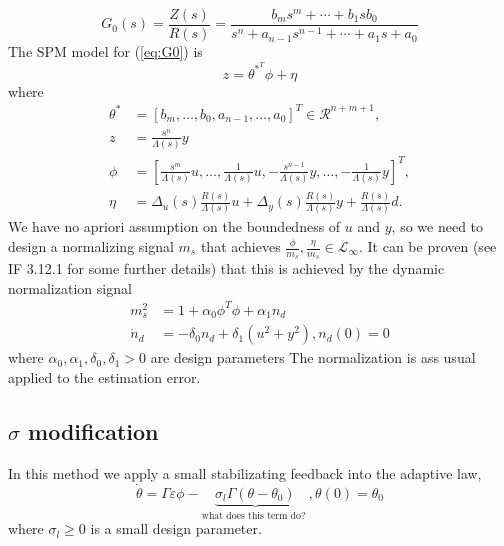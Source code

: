 \documentclass[10pt]{article}
\begin{document}
\begin{multicols*}{2}
\begin{equation}
	G_0(s)=\frac{Z(s)}{R(s)}=\frac{b_m s^m+\cdots+b_1 s b_0}{s^n+a_{n-1} s^{n-1}+\cdots+a_1 s+a_0}
	\label{eq:G0}
\end{equation}
The SPM model for (\ref{eq:G0}) is
\begin{equation}
	z=\theta^{*^T} \phi + \eta
\end{equation}
where
\begin{equation*}
	\begin{aligned}
		\theta^* & =\left[b_m, \ldots, b_0, a_{n-1}, \ldots, a_0\right]^T \in \mathcal{R}^{n+m+1},                                                         \\
		z        & =\frac{s^n}{\Lambda(s)} y                                                                                                               \\
		\phi     & =\left[\frac{s^m}{\Lambda(s)} u, \ldots, \frac{1}{\Lambda(s)} u,-\frac{s^{n-1}}{\Lambda(s)} y, \ldots,-\frac{1}{\Lambda(s)} y\right]^T, \\
		\eta     & =\Delta_u(s) \frac{R(s)}{\Lambda(s)} u+\Delta_y(s) \frac{R(s)}{\Lambda(s)} y+\frac{R(s)}{\Lambda(s)} d .
	\end{aligned}
\end{equation*}
We have no apriori assumption on the boundedness of $u$ and $y$, so we need to design a normalizing signal $m_s$ that achieves $\frac{\phi}{m_s}, \frac{\eta}{m_s} \in \mathcal{L}_{\infty}$. It can be proven (see IF 3.12.1 for some further details) that this is achieved by the dynamic normalization signal
$$
	\begin{aligned}
		m_s^2     & =1+\alpha_0 \phi^T \phi+\alpha_1 n_d                  \\
		\dot{n}_d & =-\delta_0 n_d+\delta_1\left(u^2+y^2\right), n_d(0)=0
	\end{aligned}
$$
where $\alpha_0, \alpha_1, \delta_0, \delta_1>0$ are design parameters The normalization is ass usual applied to the estimation error.
\subsection{$\sigma$ modification}
In this method we apply a small stabilizating feedback into the adaptive law,
\begin{equation}
	\dot{\theta}=\Gamma \varepsilon \phi-\underbrace{\sigma_l \Gamma\left(\theta-\theta_0\right)}_{\text {what does this term do? }}, \theta(0)=\theta_0
\end{equation}
where $\sigma _l \geq 0$ is a small design parameter.

\end{multicols*}
\end{document}
